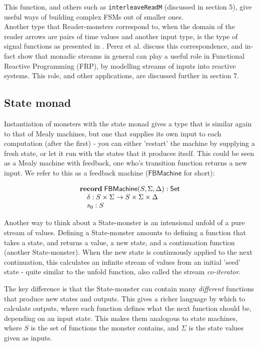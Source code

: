 This function, and others such as \verb+interleaveReadM+ (discussed in section 5), give useful ways of building complex FSMs out of smaller ones. \\

Another type that Reader-monsters correspond to, when the domain of the reader arrows are pairs of time values and another input type, is the type of signal functions as presented in \cite{frp_refactored}. Perez et al. discuss this correspondence, and in-fact show that monadic streams in general can play a useful role in Functional Reactive Programming (FRP), by modelling streams of inputs into reactive systems. This role, and other applications, are discussed further in section 7.
                             
\subsection{State monad}

Instantiation of monsters with the state monad gives a type that is similar again to that of Mealy machines, but one that supplies its own input to each computation (after the first) - you can either 'restart' the machine by supplying a fresh state, or let it run with the states that it produces itself. This could be seen as a Mealy machine with feedback, one who's transition function returns a new input. We refer to this as a feedback machine ($\mathsf{FBMachine}$ for short):

$$
\begin{array}[t]{l}
\mathbf{record}\;
\mathsf{FBMachine}(S,\Sigma,\Delta):\mathsf{Set}\\
\quad \delta : S \times \Sigma \to S \times \Sigma \times \Delta \\
\quad s_0 : S
\end{array}
$$

Another way to think about a State-monster is an intensional unfold of a pure stream of values. Defining a State-monster amounts to defining a function that takes a state, and returns a value, a new state, and a continuation function (another State-monster). When the new state is continuously applied to the next continuation, this calculates an infinite stream of values from an initial 'seed' state - quite similar to the unfold function, also called the stream \emph{co-iterator}.

The key difference is that the State-monster can contain many \emph{different} functions that produce new states and outputs. This gives a richer language by which to calculate outputs, where each function defines what the next function should be, depending on an input state. This makes them analogous to state machines, where $S$ is the set of functions the monster contains, and $\Sigma$ is the state values given as inputs.

